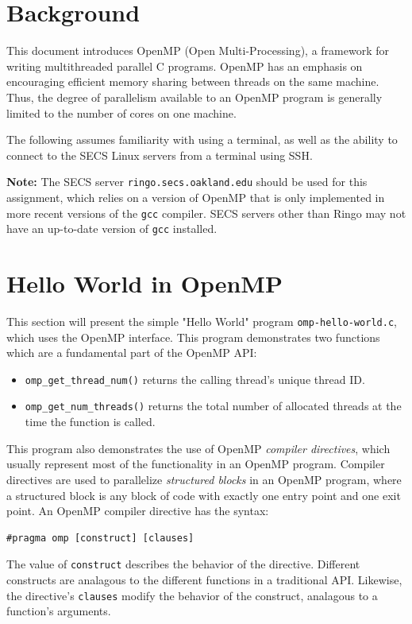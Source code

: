 \documentclass{article}
\theoremstyle{definition}
\begin{document}
\section{Background}
This document introduces OpenMP (Open Multi-Processing), a framework for writing multithreaded parallel C programs. OpenMP has an emphasis on encouraging efficient memory sharing between threads on the same machine. Thus, the degree of parallelism available to an OpenMP program is generally limited to the number of cores on one machine. 

The following assumes familiarity with using a terminal, as well as the ability to connect to the SECS Linux servers from a terminal using SSH.

\textbf{Note:} The SECS server \texttt{ringo.secs.oakland.edu} should be used for this assignment, which relies on a version of OpenMP that is only implemented in more recent versions of the \texttt{gcc} compiler. SECS servers other than Ringo may not have an up-to-date version of \texttt{gcc} installed.

\section{Hello World in OpenMP}

This section will present the simple "Hello World" program \texttt{omp-hello-world.c}, which uses the OpenMP interface. This program demonstrates two functions which are a fundamental part of the OpenMP API:
\begin{itemize}
    \item \texttt{omp\_get\_thread\_num()} returns the calling thread's unique thread ID. 
    
    \item \texttt{omp\_get\_num\_threads()} returns the total number of allocated threads at the time the function is called.
\end{itemize}

This program also demonstrates the use of OpenMP \emph{compiler directives}, which usually represent most of the functionality in an OpenMP program. Compiler directives are used to parallelize \emph{structured blocks} in an OpenMP program, where a structured block is any block of code with exactly one entry point and one exit point. An OpenMP compiler directive has the syntax:
\begin{verbatim}
#pragma omp [construct] [clauses]
\end{verbatim}
The value of \texttt{construct} describes the behavior of the directive. Different constructs are analagous to the different functions in a traditional API. Likewise, the directive's \texttt{clauses} modify the behavior of the construct, analagous to a function's arguments.
\end{document}
